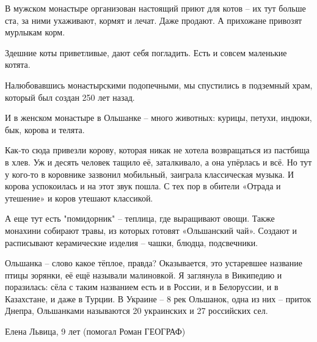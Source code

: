 В мужском монастыре организован настоящий приют для котов – их тут больше ста,
за ними ухаживают, кормят и лечат. Даже продают. А прихожане привозят мурлыкам
корм. 

Здешние коты приветливые, дают себя погладить. Есть и совсем маленькие котята.

Налюбовавшись монастырскими подопечными, мы спустились в подземный храм, который был создан 250 лет назад. 

И в женском монастыре в Ольшанке -- много животных: курицы, петухи, индюки, бык, корова и телята. 

Как-то сюда привезли корову, которая никак не хотела возвращаться из пастбища в
хлев. Уж и десять человек тащило её, заталкивало, а она упёрлась и всё. Но тут
у кого-то в коровнике зазвонил мобильный, заиграла классическая музыка. И
корова успокоилась и на этот звук пошла. С тех пор в обители «Отрада и
утешение» и коров утешают классикой.

А еще тут есть "помидорник" – теплица, где выращивают овощи. Также монахини
собирают травы, из которых готовят «Ольшанский чай». Создают и расписывают
керамические изделия – чашки, блюдца, подсвечники.

Ольшанка – слово какое тёплое, правда? Оказывается, это устаревшее название
птицы зорянки, её ещё называли малиновкой.  Я заглянула в Википедию и
поразилась: сёла с таким названием есть и в России, и в Белоруссии, и в
Казахстане, и даже в Турции. В Украине -- 8 рек Ольшанок, одна из них – приток
Днепра, Ольшанками называются 20 украинских и 27 российских сел.

Елена Львица, 9 лет (помогал Роман ГЕОГРАФ)
